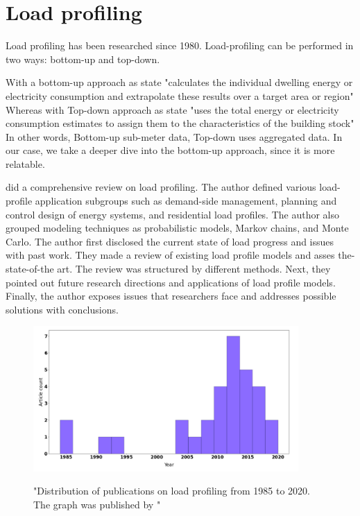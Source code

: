 \documentclass[
11pt, %
english, %
singlespacing, %
headsepline, %
]{MastersDoctoralThesis} %
\begin{document}
\section{Load profiling}

Load profiling has been researched since 1980. Load-profiling can be performed in two ways: bottom-up and top-down. 

With a bottom-up approach as \cite{SWAN20091819} state "calculates the individual dwelling energy or electricity consumption and extrapolate these results over a target area or region"
Whereas with Top-down approach as \cite{SWAN20091819} state "uses the total energy or electricity consumption estimates to assign them to the characteristics of the building stock"
In other words, Bottom-up sub-meter data, Top-down uses aggregated data. In our case, we take a deeper dive into the bottom-up approach, since it is more relatable.

\cite{Review2021} did a comprehensive review on load profiling. The author defined various load-profile application
subgroups such as demand-side management, planning and control design of energy systems, and residential load profiles. The author also 
grouped modeling techniques as probabilistic models, Markov chains, and Monte Carlo. The author first disclosed the current state of load progress and issues with past work. They made a review of existing load profile models
and asses the-state-of-the art. The review was structured by different methods. Next, they pointed out future research directions
and applications of load profile models. Finally, the author exposes issues that researchers face and addresses possible solutions with conclusions.

\begin{figure}[h!]
	\centering
	\caption{"Distribution of publications on load profiling from 1985 to 2020. The graph was published by \protect\cite{Review2021}"}
	\includegraphics[width=0.9\textwidth]{Figures/publications.png}
	\label{fig:Distribution}
\end{figure}
\end{document}
